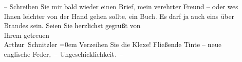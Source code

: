 \begin{ledgroupsized}[t]{13cm}
           {\pb}– Schreiben Sie mir bald wieder einen Brief, mein
               verehrter Freund – oder we{\geminationn}s Ihnen leichter von der Hand
               gehen sollte, ein Buch. Es darf ja auch eins über Brandes sein.\pend
           \pstart
           Seien Sie herzlichst gegrüßt von{\\[\baselineskip]}Ihrem getreuen{\\[\baselineskip]}\spacefill\mbox{Arthur Schnitzler}\pend
           \leftskip=0em{}\pstart
           \noindent{}Verzeihen Sie die Klexe! Fließende Tinte – neue englische Feder, – Ungeschicklichkeit. –\pend
           \endnumbering{}\end{ledgroupsized}  \newcommand{\dateiname}{L02423}\newcommand{\titel}{Arthur Schnitzler an Georg Brandes, 14. 12. 1924}\newcommand{\editorInnen}{Martin Anton Müller und Gerd-Hermann Susen}
      